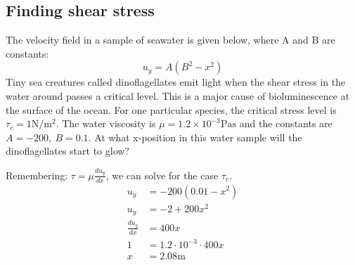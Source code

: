 \documentclass[class=report, crop=false, 12pt,a4paper]{standalone}
\begin{document}
\subsection{Finding shear stress}
The velocity field in a sample of seawater is given below, where A and B are constants:
\[ u_y = A(B^2-x^2) \]
Tiny sea creatures called dinoflagellates emit light when the shear stress in the water around passes a critical level. This is a major cause of bioluminescence at the surface of the ocean. For one particular species, the critical stress level is \(\tau_c = 1 \si{\newton\per\meter\squared}\). The water viscosity is \( \mu = 1.2 \times 10^{-3} \si{\pascal\second} \) and the constants are \(A = -200, \ B=0.1 \). At what x-position in this water sample will the dinoflagellates start to glow?

Remembering: \( \tau = \mu \frac{du_y}{dx} \), we can solve for the case \(\tau_c\).
\begin{align*}
  u_y &= -200(0.01-x^2)\\
  u_y &= -2 +200x^2\\
  \frac{du_y}{dx} &= 400x\\
  1 &= 1.2 \cdot 10^{-3} \cdot 400x\\
  x &= 2.08\si{\meter}
\end{align*}
\end{document}
